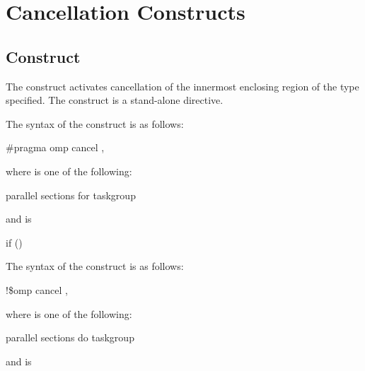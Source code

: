 \section{Cancellation Constructs}
\label{sec:Cancellation Constructs}
\subsection{ Construct}
\label{subsec:cancel Construct}
\summary
The  construct activates cancellation of the innermost enclosing region of the 
type specified. The  construct is a stand-alone directive.

\syntax
\ccppspecificstart
The syntax of the  construct is as follows:

\begin{boxedcode}
\#pragma omp cancel \plc{construct-type-clause[ [},\plc{] if-clause] new-line}
\end{boxedcode}

\begin{samepage}
where  is one of the following:

\begin{indentedcodelist}
parallel
sections
for
taskgroup
\end{indentedcodelist}
\end{samepage}

and  is
\begin{indentedcodelist}
if ()
\end{indentedcodelist}
\ccppspecificend

\fortranspecificstart
The syntax of the  construct is as follows:

\begin{boxedcode}
!\$omp cancel \plc{construct-type-clause[ [},\plc{] if-clause]}
\end{boxedcode}

\begin{samepage}
where  is one of the following:
\begin{indentedcodelist}
parallel
sections
do
taskgroup
\end{indentedcodelist}
\end{samepage}

and  is

